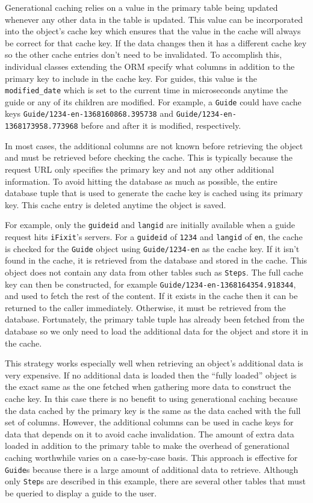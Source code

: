 \documentclass[12pt]{ucthesis}
\begin{document}
Generational caching relies on a value in the primary table being updated whenever any other data in the table is updated.
This value can be incorporated into the object's cache key which ensures that the value in the cache will always be correct for that cache key.
If the data changes then it has a different cache key so the other cache entries don't need to be invalidated.
To accomplish this, individual classes extending the ORM specify what columns in addition to the primary key to include in the cache key.
For guides, this value is the {\tt modified\_date} which is set to the current time in microseconds anytime the guide or any of its children are modified.
For example, a {\tt Guide} could have cache keys {\tt Guide/1234-en-1368160868.395738} and {\tt Guide/1234-en-1368173958.773968} before and after it is modified, respectively.

In most cases, the additional columns are not known before retrieving the object and must be retrieved before checking the cache.
This is typically because the request URL only specifies the primary key and not any other additional information.
To avoid hitting the database as much as possible, the entire database tuple that is used to generate the cache key is cached using its primary key.
This cache entry is deleted anytime the object is saved.

For example, only the {\tt guideid} and {\tt langid} are initially available when a guide request hits {\tt iFixit}'s servers.
For a {\tt guideid} of {\tt 1234} and {\tt langid} of {\tt en}, the cache is checked for the {\tt Guide} object using {\tt Guide/1234-en} as the cache key.
If it isn't found in the cache, it is retrieved from the database and stored in the cache.
This object does not contain any data from other tables such as {\tt Steps}.
The full cache key can then be constructed, for example {\tt Guide/1234-en-1368164354.918344}, and used to fetch the rest of the content.
If it exists in the cache then it can be returned to the caller immediately.
Otherwise, it must be retrieved from the database.
Fortunately, the primary table tuple has already been fetched from the database so we only need to load the additional data for the object and store it in the cache.

This strategy works especially well when retrieving an object's additional data is very expensive.
If no additional data is loaded then the ``fully loaded'' object is the exact same as the one fetched when gathering more data to construct the cache key.
In this case there is no benefit to using generational caching because the data cached by the primary key is the same as the data cached with the full set of columns.
However, the additional columns can be used in cache keys for data that depends on it to avoid cache invalidation.
The amount of extra data loaded in addition to the primary table to make the overhead of generational caching worthwhile varies on a case-by-case basis.
This approach is effective for {\tt Guide}s because there is a large amount of additional data to retrieve.
Although only {\tt Step}s are described in this example, there are several other tables that must be queried to display a guide to the user.
\end{document}
